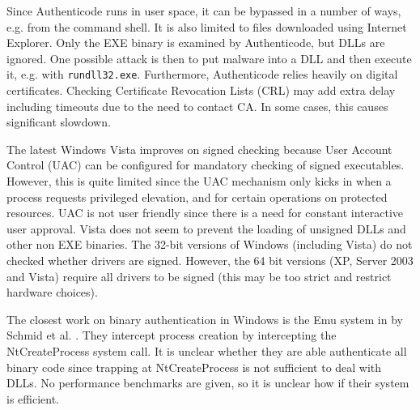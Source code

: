 Since Authenticode runs in user space,
it can be bypassed in a number of ways, e.g. from the command shell.
It is also limited to files downloaded using Internet Explorer.
Only the EXE binary is examined by Authenticode, but DLLs are ignored.
One possible attack is then to put malware into a DLL and then
execute it, e.g. with {\tt rundll32.exe}.
Furthermore, Authenticode relies heavily on digital certificates.
Checking Certificate Revocation Lists (CRL) may add extra delay 
including timeouts due to the need to contact CA.
In some cases, this causes significant slowdown.

The latest Windows Vista improves on signed checking
because User Account Control (UAC) can be configured for
mandatory checking of signed executables.
However, this is quite limited since the UAC mechanism only
kicks in when a process requests privileged elevation,
and for certain operations on protected resources.
UAC is not user friendly since there is a need for constant
interactive user approval.
Vista does not seem to prevent the loading of unsigned DLLs and 
other non EXE binaries. 
The 32-bit versions of Windows (including Vista) do not checked whether
drivers are signed.
However, the 64 bit versions (XP, Server 2003 and Vista) require
all drivers to be signed (this may be too strict and restrict hardware choices).

The closest work on binary authentication in Windows is
the Emu system in by Schmid et al. \cite{schmid2001preventing}.
They intercept process creation by intercepting the NtCreateProcess system
call. It is unclear whether they are able authenticate all binary code
since trapping at NtCreateProcess is not sufficient to deal with DLLs.
No performance benchmarks are given, so it is unclear how 
if their system is efficient.

